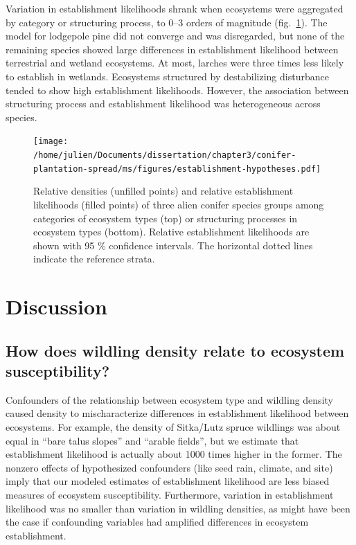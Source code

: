 \documentclass[
]{article}
\begin{document}
Variation in establishment likelihoods shrank when ecosystems were aggregated by category or structuring process, to 0--3 orders of magnitude (fig.~\ref{fig:establishment-hypotheses}).
The model for lodgepole pine did not converge and was disregarded, but none of the remaining species showed large differences in establishment likelihood between terrestrial and wetland ecosystems.
At most, larches were three times less likely to establish in wetlands.
Ecosystems structured by destabilizing disturbance tended to show high establishment likelihoods.
However, the association between structuring process and establishment likelihood was heterogeneous across species.

\newpage
\begin{landscape}

\begin{figure}
\centering
\texttt{[image: /home/julien/Documents/dissertation/chapter3/conifer-plantation-spread/ms/figures/establishment-hypotheses.pdf]}
\caption{\label{fig:establishment-hypotheses}Relative densities (unfilled points) and relative establishment likelihoods (filled points) of three alien conifer species groups among categories of ecosystem types (top) or structuring processes in ecosystem types (bottom). Relative establishment likelihoods are shown with 95 \% confidence intervals. The horizontal dotted lines indicate the reference strata.}
\end{figure}

\end{landscape}
\newpage

\hypertarget{discussion}{%
\section{Discussion}\label{discussion}}

\hypertarget{how-does-wildling-density-relate-to-ecosystem-susceptibility}{%
\subsection{How does wildling density relate to ecosystem susceptibility?}\label{how-does-wildling-density-relate-to-ecosystem-susceptibility}}

Confounders of the relationship between ecosystem type and wildling density caused density to mischaracterize differences in establishment likelihood between ecosystems.
For example, the density of Sitka/Lutz spruce wildlings was about equal in ``bare talus slopes'' and ``arable fields'', but we estimate that establishment likelihood is actually about 1000 times higher in the former.
The nonzero effects of hypothesized confounders (like seed rain, climate, and site) imply that our modeled estimates of establishment likelihood are less biased measures of ecosystem susceptibility.
Furthermore, variation in establishment likelihood was no smaller than variation in wildling densities, as might have been the case if confounding variables had amplified differences in ecosystem establishment.
\end{document}
